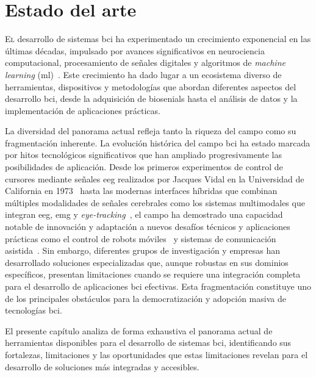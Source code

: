 {
\titlespacing*{\chapter}{0pt}{-0.1\textheight}{20pt}
\chapter{Estado del arte}
\label{chap:estado_arte}
}
\lettrine{E}{l} desarrollo de sistemas \acrshort{bci} ha experimentado un crecimiento exponencial en las últimas décadas, impulsado por avances significativos en neurociencia computacional, procesamiento de señales digitales y algoritmos de \textit{machine learning} (\acrshort{ml})~\cite{eeg_bci_review,wolpaw2002brain,dornhege2007toward,chavarriaga2017heading}. Este crecimiento ha dado lugar a un ecosistema diverso de herramientas, dispositivos y metodologías que abordan diferentes aspectos del desarrollo \acrshort{bci}, desde la adquisición de \glspl{biosenial} hasta el análisis de datos y la implementación de aplicaciones prácticas.

La diversidad del panorama actual refleja tanto la riqueza del campo como su fragmentación inherente. La evolución histórica del campo \acrshort{bci} ha estado marcada por hitos tecnológicos significativos que han ampliado progresivamente las posibilidades de aplicación. Desde los primeros experimentos de control de cursores mediante señales \acrshort{eeg} realizados por Jacques Vidal en la Universidad de California en 1973~\cite{vidal1973direct} hasta las modernas interfaces híbridas que combinan múltiples modalidades de señales cerebrales como los sistemas multimodales que integran \acrshort{eeg}, \acrshort{emg} y \textit{\gls{eye-tracking}}~\cite{pfurtscheller2010hybrid,millán2010combining}, el campo ha demostrado una capacidad notable de innovación y adaptación a nuevos desafíos técnicos y aplicaciones prácticas como el control de robots móviles~\cite{millán2004noninvasive} y sistemas de comunicación asistida~\cite{sellers2006noninvasive}. Sin embargo, diferentes grupos de investigación y empresas han desarrollado soluciones especializadas que, aunque robustas en sus dominios específicos, presentan limitaciones cuando se requiere una integración completa para el desarrollo de aplicaciones \acrshort{bci} efectivas. Esta fragmentación constituye uno de los principales obstáculos para la democratización y adopción masiva de tecnologías \acrshort{bci}.

El presente capítulo analiza de forma exhaustiva el panorama actual de herramientas disponibles para el desarrollo de sistemas \acrshort{bci}, identificando sus fortalezas, limitaciones y las oportunidades que estas limitaciones revelan para el desarrollo de soluciones más integradas y accesibles.


